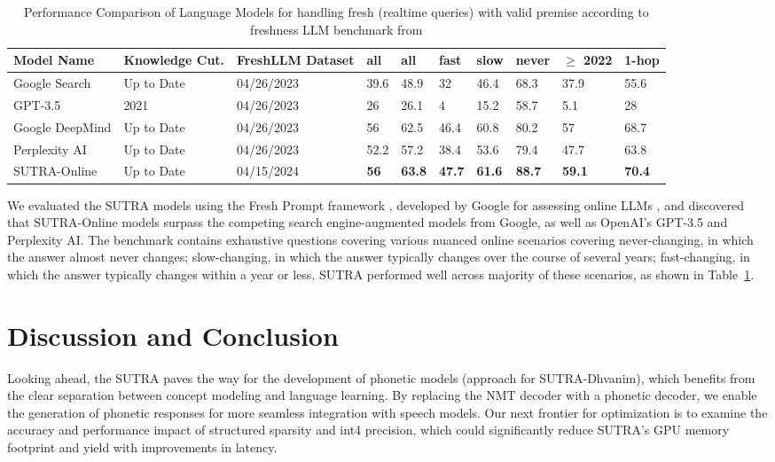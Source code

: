 \documentclass{article}
\begin{document}
\begin{table}[tb]
\setlength{\abovecaptionskip}{10pt} %
\setlength{\belowcaptionskip}{5pt} %
\centering
\begin{tabular}{@{}llllllllll@{}}
\toprule
\textbf{Model Name} & \textbf{Knowledge Cut.} & \textbf{FreshLLM Dataset} & \textbf{all} & \textbf{all} & \textbf{fast} & \textbf{slow} & \textbf{never} & \textbf{$\geq$ 2022} & \textbf{1-hop} \\ 
\midrule
Google Search & Up to Date & 04/26/2023 & 39.6 & 48.9 & 32 & 46.4 & 68.3 & 37.9 & 55.6 \\
GPT-3.5 & 2021 & 04/26/2023 & 26 & 26.1 & 4 & 15.2 & 58.7 & 5.1 & 28 \\
Google DeepMind & Up to Date & 04/26/2023 & 56 & 62.5 & 46.4 & 60.8 & 80.2 & 57 & 68.7 \\
Perplexity AI & Up to Date & 04/26/2023 & 52.2 & 57.2 & 38.4 & 53.6 & 79.4 & 47.7 & 63.8 \\
SUTRA-Online & Up to Date & 04/15/2024 & \textbf{56} & \textbf{63.8} & \textbf{47.7} & \textbf{61.6} & \textbf{88.7} & \textbf{59.1} & \textbf{70.4} \\
\bottomrule
\end{tabular}
\caption{Performance Comparison of Language Models for handling fresh (realtime queries) with valid premise according to freshness LLM benchmark from \citet{vu2023freshllms}}
\label{table:freshness_results}
\end{table}


We evaluated the SUTRA models using the Fresh Prompt framework \citep{vu2023freshllms}, developed by Google for assessing online LLMs \citep{press2022measuring}, and discovered that SUTRA-Online models surpass the competing search engine-augmented models from Google, as well as OpenAI's GPT-3.5 and Perplexity AI. The benchmark contains exhaustive questions covering various nuanced online scenarios covering never-changing, in which the answer almost never changes; slow-changing, in which the answer typically changes over the course of several years; fast-changing, in which the answer typically changes within a year or less. SUTRA performed well across majority of these scenarios, as shown in Table~\ref{table:freshness_results}. 


\section{Discussion and Conclusion}

Looking ahead, the SUTRA paves the way for the development of phonetic models (approach for SUTRA-Dhvanim), which benefits from the clear separation between concept modeling and language learning. By replacing the NMT decoder with a phonetic decoder, we enable the generation of phonetic responses for more seamless integration with speech models. Our next frontier for optimization is to examine the accuracy and performance impact of structured sparsity and int4 precision, which could significantly reduce SUTRA's GPU memory footprint and yield with improvements in latency. 
\end{document}
